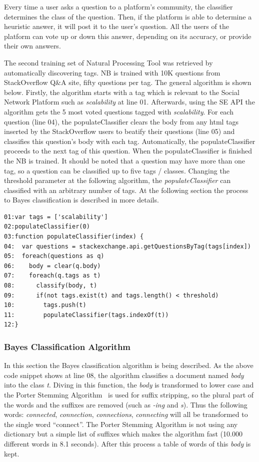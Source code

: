 Every time a user asks a question to a platform's community, the classifier determines the class of the question. Then, if the platform is able to determine a heuristic answer, it will post it to the user's question. All the users of the platform can vote up or down this answer, depending on its accuracy, or provide their own answers.

The second training set of Natural Processing Tool was retrieved by automatically discovering tags. NB is trained with 10K questions from StackOverflow Q\&A site, fifty questions per tag. The general algorithm is shown below. Firstly, the algorithm starts with a tag which is relevant to the Social Network Platform such as \emph{scalability} at line 01. Afterwards, using the SE API the algorithm gets the 5 most voted questions tagged with \emph{scalability}. For each question (line 04), the populateClassifier clears the body from any html tags inserted by the StackOverflow users to beatify their questions (line 05) and classifies this question's body with each tag. Automatically, the populateClassifier proceeds to the next tag of this question. When the populateClassifier is finished the NB is trained. It should be noted that a question may have more than one tag, so a question can be classified up to five tags / classes. Changing the threshold parameter at the following algorithm, the \emph{populateClassifier} can classified with an arbitrary number of tags. At the following section the process to Bayes classification is described in more details.

\begin{lstlisting} 
01:var tags = ['scalability']
02:populateClassifier(0)
03:function populateClassifier(index) {
04:  var questions = stackexchange.api.getQuestionsByTag(tags[index])
05:  foreach(questions as q)
06:    body = clear(q.body)
07:    foreach(q.tags as t)
08:    	 classify(body, t)
09:    	 if(not tags.exist(t) and tags.length() < threshold)
10:    	   tags.push(t)	  
11:        populateClassifier(tags.indexOf(t))
12:}		
\end{lstlisting}

\subsubsection{Bayes Classification Algorithm}
In this section the Bayes classification algorithm is being described. As the above code snippet shows at line 08, the algorithm classifies a document named \emph{body} into the class \emph{t}. Diving in this function, the \emph{body} is transformed to lower case and the Porter Stemming Algorithm~\citep{porter1980algorithm} is used for suffix stripping, so the plural part of the words and the suffixes are removed (such as \emph{-ing} and \emph{s}). Thus the following words: {\it connected}, {\it connection}, {\it connections}, {\it connecting} will all be transformed to the single word ``connect''. The Porter Stemming Algorithm is not using any dictionary but a simple list of suffixes which makes the algorithm fast (10.000 different words in 8.1 seconds). After this process a table of words of this \emph{body} is kept.

